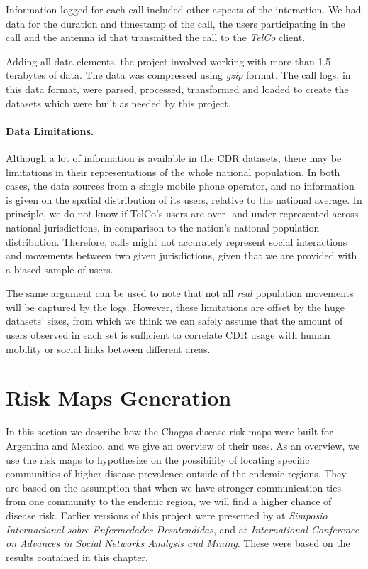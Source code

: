 Information logged for each call included other aspects of the interaction.
We had data for the duration and timestamp of the call, the users participating in the call and the antenna id that transmitted the call to the \emph{TelCo} client.

Adding all data elements, the project involved working with more than 1.5 terabytes of data.
The data was compressed using \emph{gzip} format.
The call logs, in this data format, were parsed, processed, transformed and loaded to create the datasets which were built as needed by this project.

\paragraph{Data Limitations.}
Although a lot of information is available in the CDR datasets, there may be limitations in their representations of the whole national population.
In both cases, the data sources from a single mobile phone operator, and no information is given on the spatial distribution of its users, relative to the national average.
In principle, we do not know if TelCo's users are over- and under-represented across national jurisdictions, in comparison to the nation's national population distribution.
Therefore, calls might not accurately represent social interactions and movements between two given jurisdictions, given that we are provided with a biased sample of users.

The same argument can be used to note that not all \textit{real} population movements will be captured by the logs.
However, these limitations are offset by the huge datasets' sizes, from which we think we can safely assume that the amount of users observed in each set is sufficient to correlate CDR usage with human mobility or social links between different areas.

\section{Risk Maps Generation}\label{section:risk_maps}

In this section we describe how the Chagas disease risk maps were built for Argentina and Mexico, and we give an overview of their uses.
As an overview, we use the risk maps to hypothesize on the possibility of locating specific communities of higher disease prevalence outside of the endemic regions.
They are based on the assumption that when we have stronger communication ties from one community to the endemic region, we will find a higher chance of disease risk.
Earlier versions of this project were presented by \citep{sarraute2015descubriendo} at \emph{Simposio Internacional sobre Enfermedades Desatendidas}, and \citep{deMonasterio2016analyzing} at \emph{International Conference on Advances in Social Networks Analysis and Mining}.
These were based on the results contained in this chapter.

